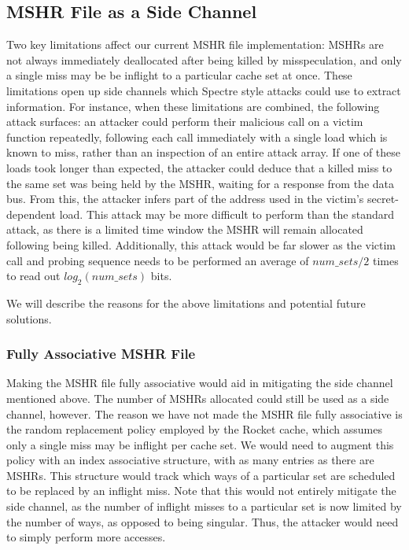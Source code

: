 \subsection{MSHR File as a Side Channel} \label{specbuf_sidechannel}
Two key limitations affect our current MSHR file implementation: MSHRs are not always immediately deallocated after being killed by misspeculation, and only a single miss may be be inflight to a particular cache set at once. These limitations open up side channels which Spectre style attacks could use to extract information. For instance, when these limitations are combined, the following attack surfaces: an attacker could perform their malicious call on a victim function repeatedly, following each call immediately with a single load which is known to miss, rather than an inspection of an entire attack array. If one of these loads took longer than expected, the attacker could deduce that a killed miss to the same set was being held by the MSHR, waiting for a response from the data bus. From this, the attacker infers part of the address used in the victim's secret-dependent load. This attack may be more difficult to perform than the standard attack, as there is a limited time window the MSHR will remain allocated following being killed. Additionally, this attack would be far slower as the victim call and probing sequence needs to be performed an average of $num\_sets/2$ times to read out $log_{2}(num\_sets)$ bits.

We will describe the reasons for the above limitations and potential future solutions.

\subsubsection{Fully Associative MSHR File}
Making the MSHR file fully associative would aid in mitigating the side channel mentioned above. The number of MSHRs allocated could still be used as a side channel, however. The reason we have not made the MSHR file fully associative is the random replacement policy employed by the Rocket cache, which assumes only a single miss may be inflight per cache set. We would need to augment this policy with an index associative structure, with as many entries as there are MSHRs. This structure would track which ways of a particular set are scheduled to be replaced by an inflight miss. Note that this would not entirely mitigate the side channel, as the number of inflight misses to a particular set is now limited by the number of ways, as opposed to being singular. Thus, the attacker would need to simply perform more accesses.

